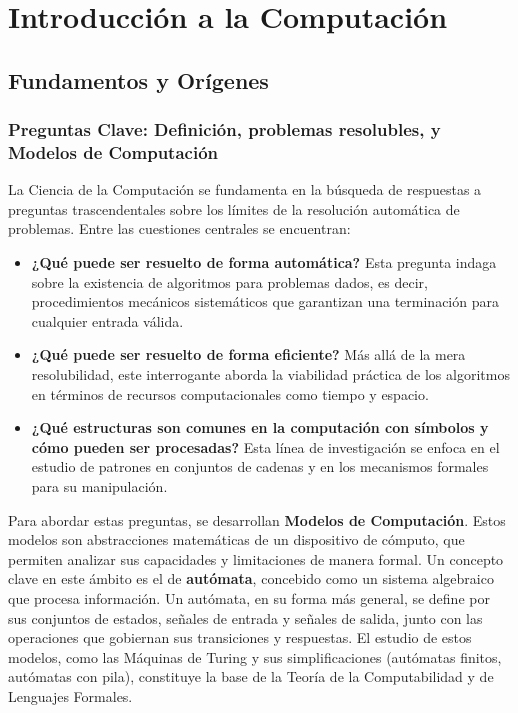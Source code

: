 \chapter{Introducción a la Computación}

\section{Fundamentos y Orígenes}

\subsection{Preguntas Clave: Definición, problemas resolubles, y Modelos de Computación}

La Ciencia de la Computación se fundamenta en la búsqueda de respuestas a preguntas trascendentales sobre los límites de la resolución automática de problemas. Entre las cuestiones centrales se encuentran:
\begin{itemize}
    \item \textbf{¿Qué puede ser resuelto de forma automática?} Esta pregunta indaga sobre la existencia de algoritmos para problemas dados, es decir, procedimientos mecánicos sistemáticos que garantizan una terminación para cualquier entrada válida.
    \item \textbf{¿Qué puede ser resuelto de forma eficiente?} Más allá de la mera resolubilidad, este interrogante aborda la viabilidad práctica de los algoritmos en términos de recursos computacionales como tiempo y espacio.
    \item \textbf{¿Qué estructuras son comunes en la computación con símbolos y cómo pueden ser procesadas?} Esta línea de investigación se enfoca en el estudio de patrones en conjuntos de cadenas y en los mecanismos formales para su manipulación.
\end{itemize}
Para abordar estas preguntas, se desarrollan \textbf{Modelos de Computación}. Estos modelos son abstracciones matemáticas de un dispositivo de cómputo, que permiten analizar sus capacidades y limitaciones de manera formal. Un concepto clave en este ámbito es el de \textbf{autómata}, concebido como un sistema algebraico que procesa información. Un autómata, en su forma más general, se define por sus conjuntos de estados, señales de entrada y señales de salida, junto con las operaciones que gobiernan sus transiciones y respuestas. El estudio de estos modelos, como las Máquinas de Turing y sus simplificaciones (autómatas finitos, autómatas con pila), constituye la base de la Teoría de la Computabilidad y de Lenguajes Formales.

